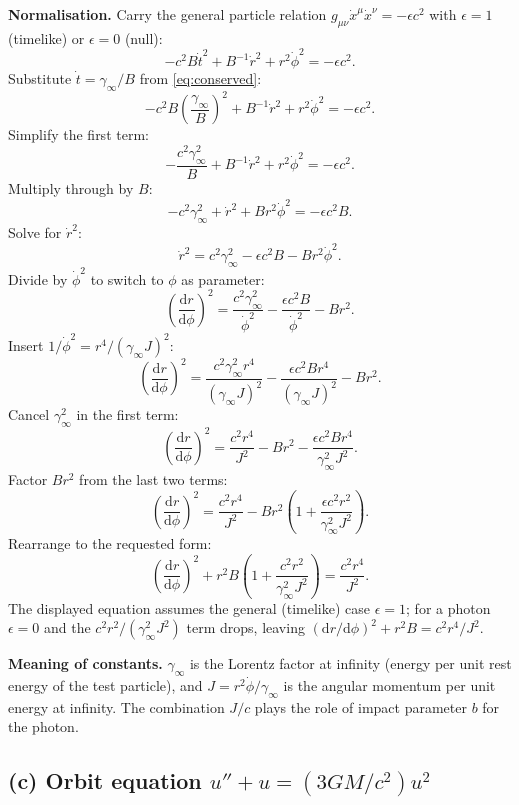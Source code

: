 \documentclass[11pt]{article}
\newcommand{\de}{\mathrm{d}}
\begin{document}
\textbf{Normalisation.} Carry the general particle relation $g_{\mu\nu}\dot x^\mu\dot x^\nu=-\epsilon c^2$ with $\epsilon=1$ (timelike) or $\epsilon=0$ (null):
\[ -c^2 B\dot t^2+B^{-1}\dot r^2+r^2\dot\phi^2=-\epsilon c^2. \]
Substitute $\dot t=\gamma_\infty/B$ from \eqref{eq:conserved}:
\[ -c^2 B\!\left(\frac{\gamma_\infty}{B}\right)^{\!2}+B^{-1}\dot r^2+r^2\dot\phi^2=-\epsilon c^2. \]
Simplify the first term:
\[ -\frac{c^2\gamma_\infty^2}{B}+B^{-1}\dot r^2+r^2\dot\phi^2=-\epsilon c^2. \]
Multiply through by $B$:
\[ -c^2\gamma_\infty^2+\dot r^2+B r^2\dot\phi^2=-\epsilon c^2 B. \]
Solve for $\dot r^2$:
\[ \dot r^2=c^2\gamma_\infty^2-\epsilon c^2 B-Br^2\dot\phi^2. \]
Divide by $\dot\phi^2$ to switch to $\phi$ as parameter:
\[ \left(\frac{\de r}{\de\phi}\right)^{\!2}=\frac{c^2\gamma_\infty^2}{\dot\phi^2}-\frac{\epsilon c^2 B}{\dot\phi^2}-Br^2. \]
Insert $1/\dot\phi^2=r^4/(\gamma_\infty J)^2$:
\[ \left(\frac{\de r}{\de\phi}\right)^{\!2}=\frac{c^2\gamma_\infty^2 r^4}{(\gamma_\infty J)^2}-\frac{\epsilon c^2 B r^4}{(\gamma_\infty J)^2}-Br^2. \]
Cancel $\gamma_\infty^2$ in the first term:
\[ \left(\frac{\de r}{\de\phi}\right)^{\!2}=\frac{c^2 r^4}{J^2}-Br^2-\frac{\epsilon c^2 B r^4}{\gamma_\infty^2 J^2}. \]
Factor $Br^2$ from the last two terms:
\[ \left(\frac{\de r}{\de\phi}\right)^{\!2}=\frac{c^2 r^4}{J^2}-Br^2\!\left(1+\frac{\epsilon c^2 r^2}{\gamma_\infty^2 J^2}\right). \]
Rearrange to the requested form:
\begin{equation}
\boxed{\;\left(\frac{\de r}{\de\phi}\right)^{\!2}+r^2 B\!\left(1+\frac{c^2 r^2}{\gamma_\infty^2 J^2}\right)=\frac{c^2 r^4}{J^2}.\;}
\label{eq:radial-eq}
\end{equation}
The displayed equation assumes the general (timelike) case $\epsilon=1$; for a photon $\epsilon=0$ and the $c^2 r^2/(\gamma_\infty^2 J^2)$ term drops, leaving $(\de r/\de\phi)^2+r^2 B=c^2 r^4/J^2$.

\textbf{Meaning of constants.} $\gamma_\infty$ is the Lorentz factor at infinity (energy per unit rest energy of the test particle), and $J=r^2\dot\phi/\gamma_\infty$ is the angular momentum per unit energy at infinity. The combination $J/c$ plays the role of impact parameter $b$ for the photon.

\subsection*{(c) Orbit equation $u''+u=(3GM/c^2)u^2$}
\end{document}

